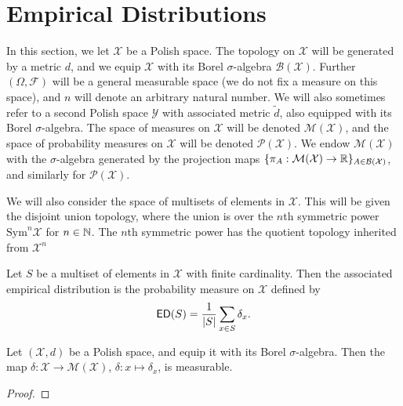 \chapter{Empirical Distributions}

In this section, we let $\mathcal{X}$ be a Polish space. The topology on $\mathcal{X}$ will be generated by a metric $d$,
and we equip $\mathcal{X}$ with its Borel $\sigma$-algebra $\mathcal{B}(\mathcal{X})$. Further $(\Omega, \mathcal{F})$
will be a general measurable space (we do not fix a measure on this space), and $n$ will denote an arbitrary natural number.
We will also sometimes refer to a second Polish space $\mathcal{Y}$ with associated metric $\tilde d$, also equipped with
its Borel $\sigma$-algebra. The space of measures on $\mathcal{X}$ will be denoted $\mathcal{M}(\mathcal{X})$, and the
space of probability measures on $\mathcal{X}$ will be denoted $\mathcal{P}(\mathcal{X})$. We endow $\mathcal{M}(\mathcal{X})$
with the $\sigma$-algebra generated by the projection maps $\{\pi_{A} : \mathcal{M}(\mathcal{X}) \to \mathbb{R}\}_{A \in \mathcal{B}(\mathcal{X})}$,
and similarly for $\mathcal{P}(\mathcal{X})$.

We will also consider the space of multisets of elements in $\mathcal{X}$. This will be given the disjoint union topology, where
the union is over the $n$th symmetric power $\mathrm{Sym}^n \mathcal{X}$ for $n \in \mathbb{N}$. The $n$th symmetric power has the quotient
topology inherited from $\mathcal{X}^n$



\begin{definition}
  \label{def:empiricalDistribution}
  \uses{}
  \notready
  Let $S$ be a multiset of elements in $\mathcal{X}$ with finite cardinality. Then the associated empirical distribution is the probability measure on $\mathcal{X}$ defined by
  \[
  {\sf ED}(S) = \frac{1}{|S|}\sum_{x \in S} \delta_{x}.
  \]
\end{definition}

\begin{lemma}
  \label{lem:dirac_prob_measure_measurable_map}
  \uses{}
  \notready
  Let $(\mathcal{X}, d)$ be a Polish space, and equip it with its Borel $\sigma$-algebra. Then the map $\delta : \mathcal{X} \to \mathcal{M}(\mathcal{X})$, $\delta : x \mapsto \delta_x$, is measurable.
\end{lemma}

\begin{proof}
  \uses{}
  \notready
\end{proof}


